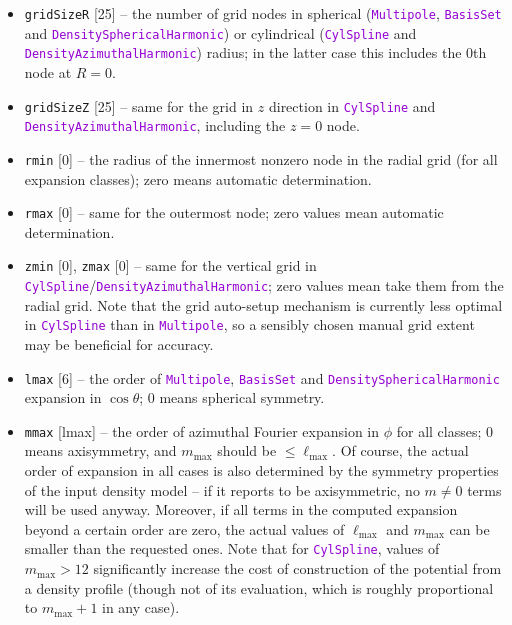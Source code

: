 \documentclass[12pt]{article}
\newcommand{\ttt}[1]{\textcolor{darkviolet}{\texttt{#1}}}
\newcommand{\ppp}[1]{\textcolor{darkolive} {\texttt{#1}}}
\begin{document}
\begin{itemize}
\item \ppp{gridSizeR} [25] -- the number of grid nodes in spherical (\ttt{Multipole}, \ttt{BasisSet} and \ttt{DensitySphericalHarmonic}) or cylindrical (\ttt{CylSpline} and \ttt{DensityAzimuthal\-Harmonic}) radius; in the latter case this includes the 0th node at $R=0$. 
\item \ppp{gridSizeZ} [25] -- same for the grid in $z$ direction in \ttt{CylSpline} and \ttt{DensityAzimuthal\-Harmonic}, including the $z=0$ node.
\item \ppp{rmin} [0] -- the radius of the innermost nonzero node in the radial grid (for all expansion classes); zero means automatic determination.
\item \ppp{rmax} [0] -- same for the outermost node; zero values mean automatic determination.
\item \ppp{zmin} [0], \ppp{zmax} [0] -- same for the vertical grid in \ttt{CylSpline}/\ttt{DensityAzimuthalHarmonic}; zero values mean take them from the radial grid. Note that the grid auto-setup mechanism is currently less optimal in \ttt{CylSpline} than in \ttt{Multipole}, so a sensibly chosen manual grid extent may be beneficial for accuracy.
\item \ppp{lmax} [6] -- the order of \ttt{Multipole}, \ttt{BasisSet} and \ttt{DensitySphericalHarmonic} expansion in $\cos\theta$; 0 means spherical symmetry. 
\item \ppp{mmax} [lmax] -- the order of azimuthal Fourier expansion in $\phi$ for all classes; 0 means axisymmetry, and $m_\mathrm{max}$ should be $\le \ell_\mathrm{max}$. Of course, the actual order of expansion in all cases is also determined by the symmetry properties of the input density model -- if it reports to be axisymmetric, no $m\ne 0$ terms will be used anyway. Moreover, if all terms in the computed expansion beyond a certain order are zero, the actual values of $\ell_\mathrm{max}$ and $m_\mathrm{max}$ can be smaller than the requested ones. Note that for \ttt{CylSpline}, values of $m_\mathrm{max}>12$ significantly increase the cost of construction of the potential from a density profile (though not of its evaluation, which is roughly proportional to $m_\mathrm{max}+1$ in any case).

\end{itemize}
\end{document}
